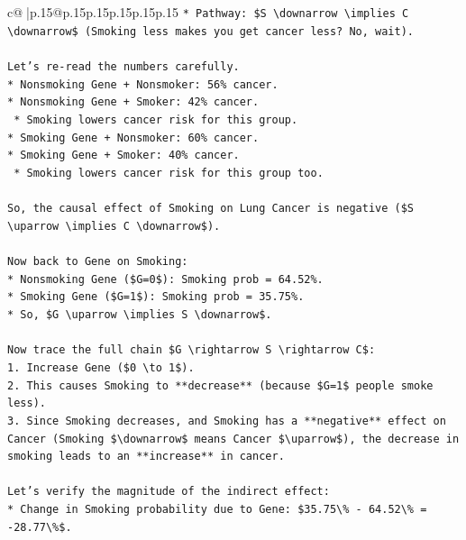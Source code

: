 \documentclass{article}
\begin{document}
{\begin{supertabular}{c@{$\;$}|p{.15\linewidth}@{}p{.15\linewidth}p{.15\linewidth}p{.15\linewidth}p{.15\linewidth}p{.15\linewidth}}
{{{\texttt{*   Pathway: \$S \textbackslash{}downarrow \textbackslash{}implies C \textbackslash{}downarrow\$ (Smoking less makes you get cancer less? No, wait).} \\
\\ 
\texttt{Let's re{-}read the numbers carefully.} \\
\texttt{*   Nonsmoking Gene + Nonsmoker: 56\% cancer.} \\
\texttt{*   Nonsmoking Gene + Smoker: 42\% cancer.} \\
\texttt{    *   Smoking lowers cancer risk for this group.} \\
\texttt{*   Smoking Gene + Nonsmoker: 60\% cancer.} \\
\texttt{*   Smoking Gene + Smoker: 40\% cancer.} \\
\texttt{    *   Smoking lowers cancer risk for this group too.} \\
\\ 
\texttt{So, the causal effect of Smoking on Lung Cancer is negative (\$S \textbackslash{}uparrow \textbackslash{}implies C \textbackslash{}downarrow\$).} \\
\\ 
\texttt{Now back to Gene on Smoking:} \\
\texttt{*   Nonsmoking Gene (\$G=0\$): Smoking prob = 64.52\%.} \\
\texttt{*   Smoking Gene (\$G=1\$): Smoking prob = 35.75\%.} \\
\texttt{*   So, \$G \textbackslash{}uparrow \textbackslash{}implies S \textbackslash{}downarrow\$.} \\
\\ 
\texttt{Now trace the full chain \$G \textbackslash{}rightarrow S \textbackslash{}rightarrow C\$:} \\
\texttt{1.  Increase Gene (\$0 \textbackslash{}to 1\$).} \\
\texttt{2.  This causes Smoking to **decrease** (because \$G=1\$ people smoke less).} \\
\texttt{3.  Since Smoking decreases, and Smoking has a **negative** effect on Cancer (Smoking \$\textbackslash{}downarrow\$ means Cancer \$\textbackslash{}uparrow\$), the decrease in smoking leads to an **increase** in cancer.} \\
\\ 
\texttt{Let's verify the magnitude of the indirect effect:} \\
\texttt{*   Change in Smoking probability due to Gene: \$35.75\textbackslash{}\% {-} 64.52\textbackslash{}\% = {-}28.77\textbackslash{}\%\$.} \\
}}}
\end{supertabular}}
\end{document}
